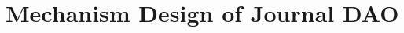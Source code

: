 \documentclass[lettersize,journal]{IEEEtran}
\begin{document}
\section{Mechanism Design of Journal DAO \label{sec:mechanism}}




















\end{document}
